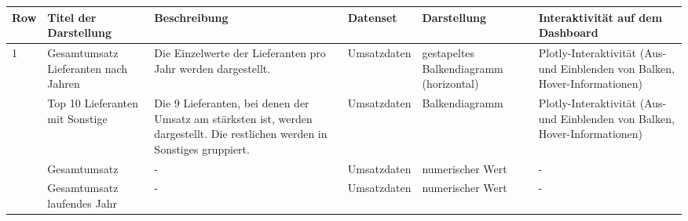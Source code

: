     \clearpage
    \recalctypearea  
    \begingroup
    \setlength{\tabcolsep}{12pt} %
    \renewcommand{\arraystretch}{1.5}
    \begin{table}[h]
        \LARGE
        \centering
        \begin{adjustbox}{max width=\textwidth}
        \begin{tabular}{p{}p{}p{}p{}p{}p{}}
           \toprule
           Row        &Titel der Darstellung &Beschreibung &Datenset &Darstellung &Interaktivität auf dem Dashboard\\
           \midrule
            1           &Gesamtumsatz Lieferanten nach Jahren &Die Einzelwerte der Lieferanten pro Jahr werden dargestellt.   &Umsatzdaten    &gestapeltes Balkendiagramm (horizontal)    &Plotly-Interaktivität (Aus- und Einblenden von Balken, Hover-Informationen)\\
                        &Top 10 Lieferanten mit Sonstige &Die 9 Lieferanten, bei denen der Umsatz am stärksten ist, werden dargestellt. Die restlichen werden in Sonstiges gruppiert.   &Umsatzdaten    &Balkendiagramm    &Plotly-Interaktivität (Aus- und Einblenden von Balken, Hover-Informationen)\\
                        &Gesamtumsatz&-&Umsatzdaten    &numerischer Wert   &-\\
                        &Gesamtumsatz laufendes Jahr&-&Umsatzdaten    &numerischer Wert   &-\\
            

\end{tabular}
\end{adjustbox}
\end{table}
